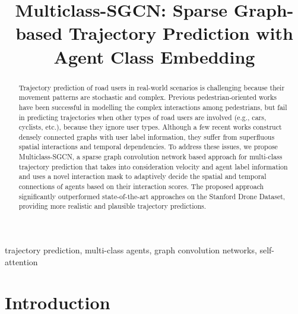 \documentclass{article}
\title{Multiclass-SGCN: Sparse Graph-based Trajectory Prediction with Agent Class Embedding}
\begin{document}
\maketitle
\begin{abstract}
Trajectory prediction of road users in real-world scenarios is challenging because their movement patterns are stochastic and complex. Previous pedestrian-oriented works have been successful in modelling the complex interactions among pedestrians, but fail in predicting trajectories when other types of road users are involved (e.g., cars, cyclists, etc.), because they ignore user types. Although a few recent works construct densely connected graphs with user label information, they suffer from superfluous spatial interactions and temporal dependencies. To address these issues, we propose Multiclass-SGCN, a sparse graph convolution network based approach for multi-class trajectory prediction that takes into consideration velocity and agent label information and uses a novel interaction mask to adaptively decide the spatial and temporal connections of agents based on their interaction scores. The proposed approach significantly outperformed state-of-the-art approaches on the Stanford Drone Dataset, providing more realistic and plausible trajectory predictions.


\end{abstract}
\begin{keywords}
trajectory prediction, multi-class agents, graph convolution networks, self-attention
\end{keywords}




\section{Introduction}
\label{sec:intro}

\renewcommand{\thefootnote}{\fnsymbol{footnote}}
\end{document}
